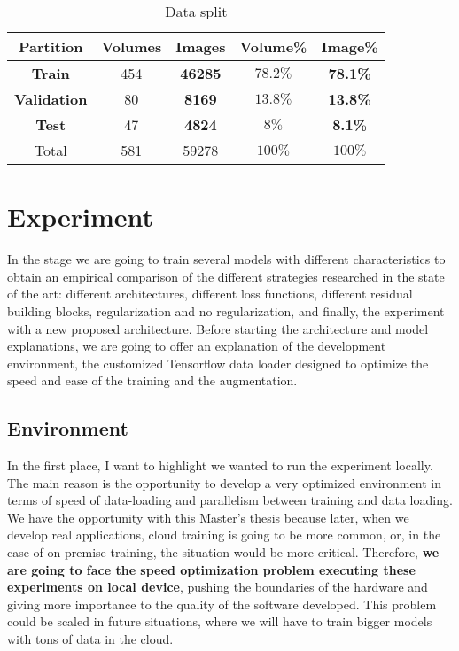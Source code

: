 \begin{table}[!ht]
  \begin{center}
   \setlength\extrarowheight{2pt} %
   \begin{tabular}{c c c c c}
    \toprule
    \textbf{Partition} & \textbf{Volumes} & \textbf{Images} & \textbf{Volume\%} & \textbf{Image\%}\\
    \hline   
    \textbf{Train}       & 454   & \textbf{46285}& $78.2\%$  & \textbf{78.1\%}       \\
    \textbf{Validation}  & 80    & \textbf{8169} & $13.8\%$  & \textbf{13.8\%}       \\
    \textbf{Test}        & 47    & \textbf{4824} & $8\%$     & \textbf{8.1\%}        \\
    \hline
    Total                & 581   & 59278        & $100\%$   & $100\%$               \\
    \bottomrule
    \end{tabular}
    \end{center}
    \caption{Data split}
    \label{table:datasplit}
\end{table}

\FloatBarrier
\newpage

\section{Experiment}

In the stage we are going to train several models with different characteristics to obtain an empirical comparison of the different strategies researched in the state of the art: different architectures, different loss functions, different residual building blocks, regularization and no regularization, and finally, the experiment with a new proposed architecture. Before starting the architecture and model explanations, we are going to offer an explanation of the development environment, the customized Tensorflow data loader designed to optimize the speed and ease of the training and the augmentation.

\subsection{Environment}

In the first place, I want to highlight we wanted to run the experiment locally. The main reason is the opportunity to develop a very optimized environment in terms of speed of data-loading and parallelism between training and data loading. We have the opportunity with this Master's thesis because later, when we develop real applications, cloud training is going to be more common, or, in the case of on-premise training, the situation would be more critical. Therefore, \textbf{we are going to face the speed optimization problem executing these experiments on local device}, pushing the boundaries of the hardware and giving more importance to the quality of the software developed. This problem could be scaled in future situations, where we will have to train bigger models with tons of data in the cloud.

